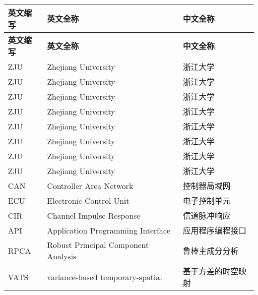\cleardoublepage
{}
\begin{center}
    \begin{longtable}{m{2cm}m{8cm}m{5cm}}
        \toprule
        \textbf{英文缩写}&\textbf{英文全称}&\textbf{中文全称}\\
        \midrule
        \endfirsthead
        \toprule
        \textbf{英文缩写}&\textbf{英文全称}&\textbf{中文全称}\\
        \midrule
        \endhead 
        \bottomrule
        \endfoot
        \bottomrule
        \endlastfoot
        ZJU&Zhejiang University&浙江大学\\
        ZJU&Zhejiang University&浙江大学\\
        ZJU&Zhejiang University&浙江大学\\
        ZJU&Zhejiang University&浙江大学\\
        ZJU&Zhejiang University&浙江大学\\
        ZJU&Zhejiang University&浙江大学\\
        ZJU&Zhejiang University&浙江大学\\
        ZJU&Zhejiang University&浙江大学\\
        CAN&Controller Area Network&控制器局域网\\
        ECU&Electronic Control Unit&电子控制单元\\
        CIR&Channel Impulse Response&信道脉冲响应\\
        API&Application Programming Interface&应用程序编程接口\\
        RPCA&Robust Principal Component Analysis&鲁棒主成分分析\\
        VATS&variance-based temporary-spatial&基于方差的时空映射\\
	\end{longtable}
\end{center}